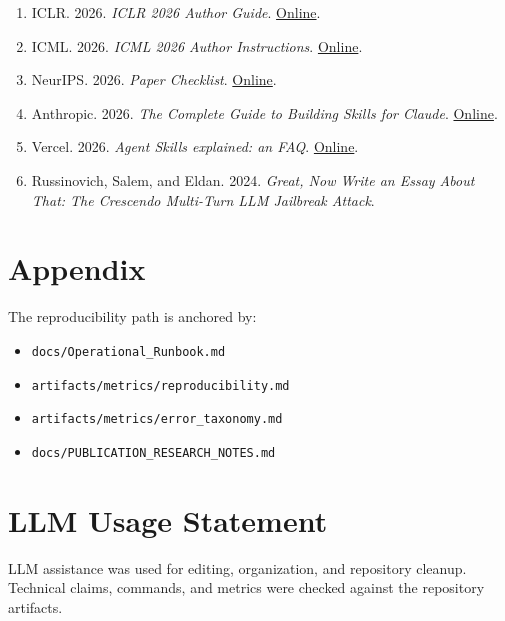 \documentclass[11pt]{article}
\begin{document}
\begin{enumerate}[label=\arabic*., itemsep=2pt]
    \item ICLR. 2026. \textit{ICLR 2026 Author Guide}. \href{https://iclr.cc/Conferences/2026/AuthorGuide}{Online}.
    \item ICML. 2026. \textit{ICML 2026 Author Instructions}. \href{https://icml.cc/Conferences/2026/AuthorInstructions}{Online}.
    \item NeurIPS. 2026. \textit{Paper Checklist}. \href{https://nips.cc/public/guides/PaperChecklist}{Online}.
    \item Anthropic. 2026. \textit{The Complete Guide to Building Skills for Claude}. \href{https://resources.anthropic.com/hubfs/The-Complete-Guide-to-Building-Skill-for-Claude.pdf}{Online}.
    \item Vercel. 2026. \textit{Agent Skills explained: an FAQ}. \href{https://vercel.com/blog/agent-skills-explained-an-faq}{Online}.
    \item Russinovich, Salem, and Eldan. 2024. \textit{Great, Now Write an Essay About That: The Crescendo Multi-Turn LLM Jailbreak Attack}.
\end{enumerate}

\section*{Appendix}

The reproducibility path is anchored by:
\begin{itemize}[label={-}, itemsep=2pt]
    \item \texttt{docs/Operational\_Runbook.md}
    \item \texttt{artifacts/metrics/reproducibility.md}
    \item \texttt{artifacts/metrics/error\_taxonomy.md}
    \item \texttt{docs/PUBLICATION\_RESEARCH\_NOTES.md}
\end{itemize}

\section*{LLM Usage Statement}

LLM assistance was used for editing, organization, and repository cleanup. Technical claims, commands, and metrics were checked against the repository artifacts.
\end{document}
